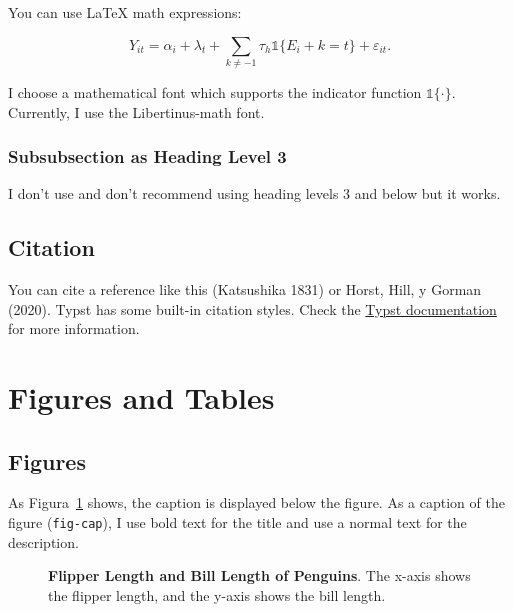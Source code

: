\documentclass[
  12pt,
  letterpaper,
]{article}
\begin{document}
You can use LaTeX math expressions:

\[
Y_{it} = \alpha_i + \lambda_t + \sum_{k \neq -1} \tau_h \mathbb{1}\{E_i + k = t\} +
\varepsilon_{it}.
\]

I choose a mathematical font which supports the indicator function
\(\mathbb{1}\{\cdot\}\). Currently, I use the Libertinus-math font.

\subsubsection{Subsubsection as Heading Level
3}\label{subsubsection-as-heading-level-3}

I don't use and don't recommend using heading levels 3 and below but it
works.

\subsection{Citation}\label{citation}

You can cite a reference like this (Katsushika 1831) or Horst, Hill, y
Gorman (2020). Typst has some built-in citation styles. Check the
\href{https://typst.app/docs/reference/model/bibliography/\#parameters-style}{Typst
documentation} for more information.

\section{Figures and Tables}\label{figures-and-tables}

\subsection{Figures}\label{figures}

As Figura~\ref{fig-facet} shows, the caption is displayed below the
figure. As a caption of the figure (\texttt{fig-cap}), I use bold text
for the title and use a normal text for the description.

\begin{figure}[!t]


\caption{\label{fig-facet}\textbf{Flipper Length and Bill Length of
Penguins}. The x-axis shows the flipper length, and the y-axis shows the
bill length.}

\end{figure}%
\end{document}
